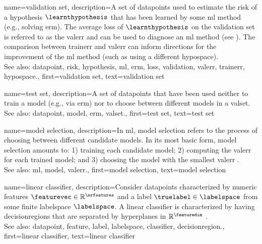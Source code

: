 {name={validation set},
 	description={A set of \glspl{datapoint} used to estimate 
  		the \gls{risk} of a \gls{hypothesis} $\learnthypothesis$ that has been learned by some 
  		\gls{ml} method (e.g., solving \gls{erm}). The average \gls{loss} of $\learnthypothesis$ 
  		on the \gls{validation} set is referred to as the \gls{valerr} and can be used to diagnose an 
  		\gls{ml} method (see \cite[Sec. 6.6]{MLBasics}). The comparison between \gls{trainerr} 
  		and \gls{valerr} can inform directions for the improvement of the \gls{ml} method (such as 
  		using a different \gls{hypospace}).
			\\
		See also: \gls{datapoint}, \gls{risk}, \gls{hypothesis}, \gls{ml}, \gls{erm}, \gls{loss}, \gls{validation}, \gls{valerr}, \gls{trainerr}, \gls{hypospace}.},
	first={validation set},
	text={validation set}  
}

{name={test set},
	description={A set of \glspl{datapoint} that have  
		been used neither to train a \gls{model} (e.g., via \gls{erm}) nor 
		to choose between different \glspl{model} in a \gls{valset}.
				\\
		See also: \gls{datapoint}, \gls{model}, \gls{erm}, \gls{valset}.},
	first={test set},
	text={test set}  
}


{name={model selection},
	description={In \gls{ml}, \gls{model} selection refers to the 
		process of choosing between different candidate \glspl{model}. In its most 
		basic form, \gls{model} selection amounts to: 1) training each candidate \gls{model}; 
		2) computing the \gls{valerr} for each trained \gls{model}; and 3) choosing the \gls{model} 
		with the smallest \gls{valerr} \cite[Ch. 6]{MLBasics}. 
				\\
		See also: \gls{ml}, \gls{model}, \gls{valerr}.},
	first={model selection},
	text={model selection}  
}


{name={linear classifier}, 
	description={Consider \glspl{datapoint} characterized by numeric \glspl{feature} $\featurevec \in \mathbb{R}^{\nrfeatures}$ 
	    	and a \gls{label} $\truelabel \in \labelspace$ from some finite \gls{labelspace} $\labelspace$. 
		A linear \gls{classifier} is characterized by having \glspl{decisionregion} that are 
		separated by hyperplanes in $\mathbb{R}^{\featuredim}$ \cite[Ch. 2]{MLBasics}.
				\\
		See also: \gls{datapoint}, \gls{feature}, \gls{label}, \gls{labelspace}, \gls{classifier}, \gls{decisionregion}.},
	first={linear classifier},
	text={linear classifier} 
}


